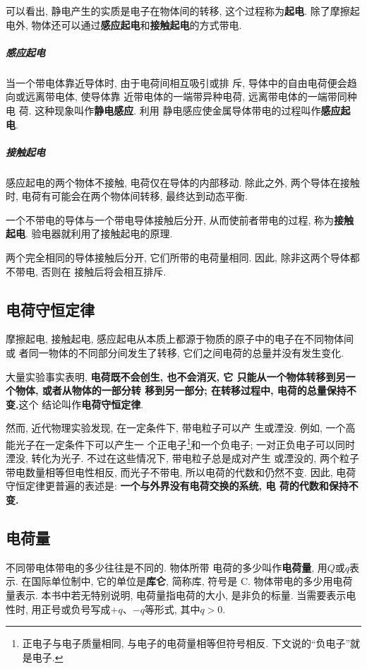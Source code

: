 \documentclass[11pt,a4paper]{ctexbook}
\begin{document}
可以看出, 静电产生的实质是电子在物体间的转移, 这个过程称为\textbf{起电}.
除了摩擦起电外, 物体还可以通过\textbf{感应起电}和\textbf{接触起电}的方式带电.

\subparagraph{感应起电} 当一个带电体靠近导体时, 由于电荷间相互吸引或排
斥, 导体中的自由电荷便会趋向或远离带电体, 使导体靠
近带电体的一端带异种电荷, 远离带电体的一端带同种电
荷. 这种现象叫作\textbf{静电感应}. 利用
静电感应使金属导体带电的过程叫作\textbf{感应起电}.

\subparagraph{接触起电} 感应起电的两个物体不接触, 电荷仅在导体的内部移动.
除此之外, 两个导体在接触时, 电荷有可能会在两个物体间转移, 最终达到动态平衡.

一个不带电的导体与一个带电导体接触后分开, 从而使前者带电的过程, 称为\textbf{接触起电}.
验电器就利用了接触起电的原理.

两个完全相同的导体接触后分开, 它们所带的电荷量相同. 因此, 除非这两个导体都不带电, 否则在
接触后将会相互排斥.

\subsection{电荷守恒定律}

摩擦起电, 接触起电, 感应起电从本质上都源于物质的原子中的电子在不同物体间或
者同一物体的不同部分间发生了转移, 它们之间电荷的总量并没有发生变化.

大量实验事实表明, \textbf{电荷既不会创生, 也不会消灭, 它
    只能从一个物体转移到另一个物体, 或者从物体的一部分转
    移到另一部分; 在转移过程中, 电荷的总量保持不变.}这个
结论叫作\textbf{电荷守恒定律}.

然而, 近代物理实验发现, 在一定条件下, 带电粒子可以产
生或湮没. 例如, 一个高能光子在一定条件下可以产生一
个正电子\footnote{正电子与电子质量相同, 与电子的电荷量相等但符号相反. 下文说的``负电子''就是电子.}和一个负电子; 一对正负电子可以同时湮没,
转化为光子. 不过在这些情况下, 带电粒子总是成对产生
或湮没的, 两个粒子带电数量相等但电性相反, 而光子不带电, 所以电荷的代数和仍然不变.
因此, 电荷守恒定律更普遍的表述是: \textbf{一个与外界没有电荷交换的系统, 电
    荷的代数和保持不变.}

\subsection{电荷量}

不同带电体带电的多少往往是不同的. 物体所带
电荷的多少叫作\textbf{电荷量}, 用$Q$或$q$表示. 在国际单位制中, 它的单位是\textbf{库仑},
简称库, 符号是 C. 物体带电的多少用电荷量表示. 本书中若无特别说明, 电荷量指电荷的大小, 是非负的标量. 当需要表示电性时, 用正号或负号写成$+q$、$-q$等形式, 其中$q>0$.
\end{document}
